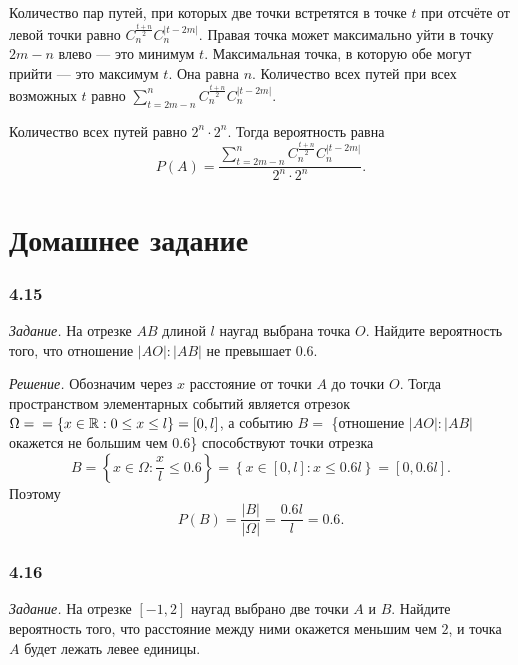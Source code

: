 Количество пар путей, при которых две точки встретятся в точке $t$ при отсчёте от левой точки равно $C_n^{ \frac{t+n}{2} } C_n^{ \left| t-2m \right| }$.
Правая точка может максимально уйти в точку $2m - n$ влево --- это минимум $t$.
Максимальная точка, в которую обе могут прийти --- это максимум $t$.
Она равна $n$.
Количество всех путей при всех возможных $t$ равно $ \sum \limits_{t=2m-n}^n C_n^{ \frac{t+n}{2} } C_n^{ \left| t-2m \right| }$.

Количество всех путей равно $2^n \cdot 2^n$.
Тогда вероятность равна
$$P \left( A \right) =
\frac{ \sum \limits_{t=2m-n}^n C_n^{ \frac{t+n}{2} } C_n^{ \left| t-2m \right| }}{2^n \cdot 2^n}.$$

\section*{Домашнее задание}

\subsubsection*{4.15}

\textit{Задание.} На отрезке $AB$ длиной $l$ наугад выбрана точка $O$.
Найдите вероятность того, что отношение $|AO|:|AB|$ не превышает $0.6$.

\textit{Решение.} Обозначим через $x$ расстояние от точки $A$ до точки $O$.
Тогда пространством элементарных событий является отрезок
$ \Omega = \\
= \left\{ x \in \mathbb{R}: 0 \leq x \leq l \right\} =
\left[ 0, l \right] $,
а событию $B = $ 
\{отношение $|AO|:|AB|$ окажется не большим чем $0.6$\}
способствуют точки отрезка
$$B =
\left\{ x \in \Omega : \frac{x}{l} \leq 0.6 \right\} =
\left\{ x \in \left[ 0, l \right] : x \leq 0.6 l \right\} =
\left[ 0, 0.6 l \right].$$
Поэтому
$$P \left( B \right) =
\frac{|B|}{| \Omega |} =
\frac{0.6 l}{l} =
0.6.$$

\subsubsection*{4.16}

\textit{Задание.} На отрезке $ \left[ -1, 2 \right] $ наугад выбрано две точки $A$ и $B$.
Найдите вероятность того, что расстояние между ними окажется меньшим чем $2$, и точка $A$ будет лежать левее единицы.

